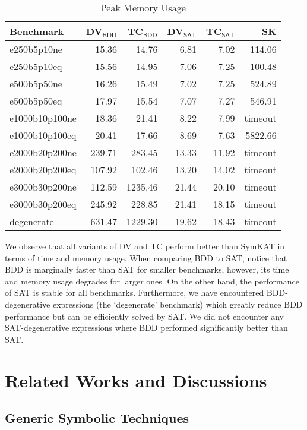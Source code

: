 \documentclass[conference]{IEEEtran}
\begin{document}
\begin{table}[H]
\footnotesize
\centering
\setlength{\tabcolsep}{3pt}
\begin{tabular}{l r r r r r}
    Benchmark & DV$_{\textsf{BDD}}$ & TC$_{\textsf{BDD}}$ & DV$_{\textsf{SAT}}$ & TC$_{\textsf{SAT}}$ & SK \\
    \hline
    e250b5p10ne    &  15.36 &   14.76 &  6.81 &  7.02 &  114.06 \\
    e250b5p10eq    &  15.56 &   14.95 &  7.06 &  7.25 &  100.48 \\
    e500b5p50ne    &  16.26 &   15.49 &  7.02 &  7.25 &  524.89 \\
    e500b5p50eq    &  17.97 &   15.54 &  7.07 &  7.27 &  546.91 \\
    e1000b10p100ne &  18.36 &   21.41 &  8.22 &  7.99 & timeout \\
    e1000b10p100eq &  20.41 &   17.66 &  8.69 &  7.63 & 5822.66 \\
    e2000b20p200ne & 239.71 &  283.45 & 13.33 & 11.92 & timeout \\
    e2000b20p200eq & 107.92 &  102.46 & 13.20 & 14.02 & timeout \\
    e3000b30p200ne & 112.59 & 1235.46 & 21.44 & 20.10 & timeout \\
    e3000b30p200eq & 245.92 &  228.85 & 21.41 & 18.15 & timeout \\
    degenerate     & 631.47 & 1229.30 & 19.62 & 18.43 & timeout
\end{tabular}
\caption{Peak Memory Usage}\label{tab:benchmark-memory}
\end{table}

We observe that all variants of DV and TC perform better than SymKAT in terms of time and memory usage. When comparing BDD to SAT, notice that BDD is marginally faster than SAT for smaller benchmarks, however, its time and memory usage degrades for larger ones. On the other hand, the performance of SAT is stable for all benchmarks. Furthermore, we have encountered BDD-degenerative expressions (the `degenerate' benchmark) which greatly reduce BDD performance but can be efficiently solved by SAT. We did not encounter any SAT-degenerative expressions where BDD performed significantly better than SAT.

\section{Related Works and Discussions}

\subsection{Generic Symbolic Techniques}
\end{document}
